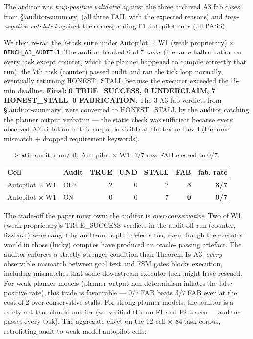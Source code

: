 The auditor was \emph{trap-positive validated} against the three archived A3 fab cases from \S\ref{auditor-summary} (all
three FAIL with the expected reasons) and \emph{trap-negative validated} against the corresponding
F1 autopilot runs (all PASS).

We then re-ran the 7-task suite under Autopilot × W1 (weak proprietary) × \texttt{BENCH\_A3\_AUDIT=1}. The
auditor blocked 6 of 7 tasks (filename hallucination on every task except counter, which the
planner happened to compile correctly that run); the 7th task (counter) passed audit and ran the
tick loop normally, eventually returning HONEST\_STALL because the executor exceeded the 15-min
deadline. \textbf{Final: 0 TRUE\_SUCCESS, 0 UNDERCLAIM, 7 HONEST\_STALL, 0 FABRICATION.} The 3 A3 fab
verdicts from \S\ref{auditor-summary} were converted to HONEST\_STALL by the auditor catching the planner output
verbatim --- the static check was sufficient because every observed A3 violation in this corpus is
visible at the textual level (filename mismatch + dropped requirement keywords).

{\scriptsize\begin{longtable}[]{@{}llrrrrr@{}}
\caption{Static auditor on/off, Autopilot $\times$ W1: 3/7 raw FAB cleared to 0/7.}\label{tab:static-onoff}\\
\toprule\noalign{}
Cell & Audit & TRUE & UND & STALL & FAB & fab. rate \\
\midrule\noalign{}
\endhead
\bottomrule\noalign{}
\endlastfoot
Autopilot × W1 & OFF & 2 & 0 & 2 & \textbf{3} & \textbf{3/7} \\
Autopilot × W1 & ON & 0 & 0 & 7 & \textbf{0} & \textbf{0/7} \\
\end{longtable}}

The trade-off the paper must own: the auditor is \emph{over-conservative}. Two of W1 (weak proprietary)\textquotesingle s
TRUE\_SUCCESS verdicts in the audit-off run (counter, fizzbuzz) were caught by audit-on as plan
defects too, even though the executor would in those (lucky) compiles have produced an oracle-
passing artefact. The auditor enforces a strictly stronger condition than Theorem 1\textquotesingle s A3:
\emph{every} observable mismatch between goal text and FSM gates blocks execution, including
mismatches that some downstream executor luck might have rescued. For weak-planner models
(planner-output non-determinism inflates the false-positive rate), this trade is favourable ---
0/7 FAB beats 3/7 FAB even at the cost of 2 over-conservative stalls. For strong-planner
models, the auditor is a safety net that should not fire (we verified this on F1 and
F2 traces --- auditor passes every task). The aggregate effect on the 12-cell × 84-task
corpus, retrofitting audit to weak-model autopilot cells:

